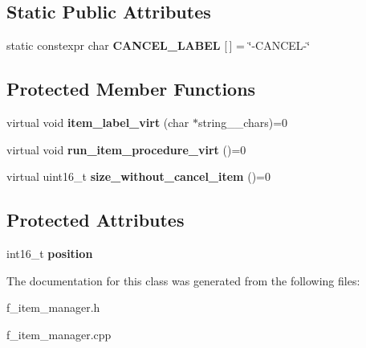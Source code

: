 \subsection*{Static Public Attributes}
\begin{DoxyCompactItemize}
\item 
\mbox{\label{classui_1_1_item_manager_a3ca45c4b3e9a5a719dc17bee414a94d2}} 
static constexpr char {\bfseries C\+A\+N\+C\+E\+L\+\_\+\+L\+A\+B\+EL} \mbox{[}$\,$\mbox{]} = \char`\"{}-\/C\+A\+N\+C\+EL-\/\char`\"{}
\end{DoxyCompactItemize}
\subsection*{Protected Member Functions}
\begin{DoxyCompactItemize}
\item 
\mbox{\label{classui_1_1_item_manager_a5a78ac89f34d5494f68604158e8dad0b}} 
virtual void {\bfseries item\+\_\+label\+\_\+virt} (char $\ast$string\+\_\+\_\+chars)=0
\item 
\mbox{\label{classui_1_1_item_manager_a56a8183daee120f854a8adb090d03365}} 
virtual void {\bfseries run\+\_\+item\+\_\+procedure\+\_\+virt} ()=0
\item 
\mbox{\label{classui_1_1_item_manager_a76e337fb404312d06cf6519f0ad85def}} 
virtual uint16\+\_\+t {\bfseries size\+\_\+without\+\_\+cancel\+\_\+item} ()=0
\end{DoxyCompactItemize}
\subsection*{Protected Attributes}
\begin{DoxyCompactItemize}
\item 
\mbox{\label{classui_1_1_item_manager_a024f1b3fb93ce2259240fd6a21abd701}} 
int16\+\_\+t {\bfseries position}
\end{DoxyCompactItemize}


The documentation for this class was generated from the following files\+:\begin{DoxyCompactItemize}
\item 
f\+\_\+item\+\_\+manager.\+h\item 
f\+\_\+item\+\_\+manager.\+cpp\end{DoxyCompactItemize}
